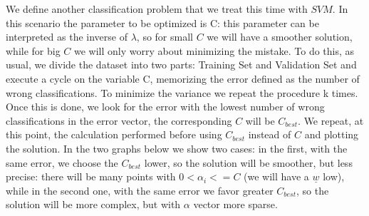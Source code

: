 	
We define another classification problem that we treat this time with $SVM $.	
In this scenario the parameter to be optimized is C: this parameter can be interpreted as the inverse of $\lambda$, so for small $C$ we will have a smoother solution, while for big $C$ we will only worry about minimizing the mistake.
To do this, as usual, we divide the dataset into two parts: Training Set and Validation Set and execute a cycle on the variable C, memorizing the error defined as the number of wrong classifications. To minimize the variance we repeat the procedure k times.
Once this is done, we look for the error with the lowest number of wrong classifications in the error vector, the corresponding $C$ will be $C_{best}$.	
We repeat, at this point, the calculation performed before using $C_{best}$ instead of $ C $ and plotting the solution.
In the two graphs below we show two cases: in the first, with the same error, we choose the $C_{best}$ lower, so the solution will be smoother, but less precise: there will be many points with $ 0 <\alpha_i<=C$ (we will have a $\underline{w}$ low), while in the second one, with the same error we favor greater $C_{best}$, so the solution will be more complex, but with $\alpha$ vector more sparse.	
\begin{figure}[!ht]
	\centering
	 \quad
	 \\
	
\end{figure}
